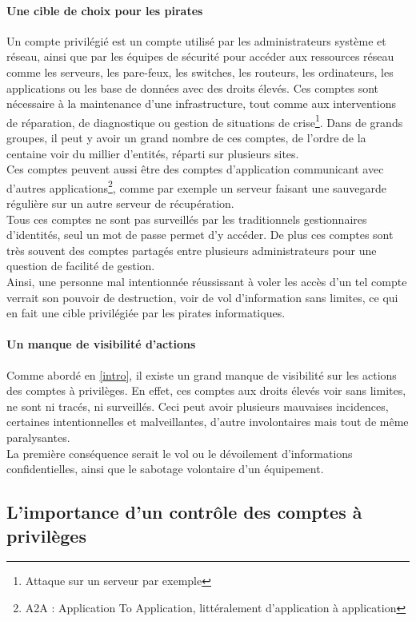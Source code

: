 \paragraph{Une cible de choix pour les pirates}
Un compte privilégié est un compte utilisé par les administrateurs système et réseau, ainsi que par les équipes de sécurité pour accéder aux ressources réseau comme les serveurs, les pare-feux, les switches, les routeurs, les ordinateurs, les applications ou les base de données avec des droits élevés. Ces comptes sont nécessaire à la maintenance d'une infrastructure, tout comme aux interventions de réparation, de diagnostique ou gestion de situations de crise\footnote{Attaque sur un serveur par exemple}. Dans de grands groupes, il peut y avoir un grand nombre de ces comptes, de l'ordre de la centaine voir du millier d'entités, réparti sur plusieurs sites.\\
Ces comptes peuvent aussi être des comptes d'application communicant avec d'autres applications\footnote{A2A : Application To Application, littéralement d'application à application}, comme par exemple un serveur faisant une sauvegarde régulière sur un autre serveur de récupération.\\
Tous ces comptes ne sont pas surveillés par les traditionnels gestionnaires d'identités, seul un mot de passe permet d'y accéder. De plus ces comptes sont très souvent des comptes partagés entre plusieurs administrateurs pour une question de facilité de gestion.\\
Ainsi, une personne mal intentionnée réussissant à voler les accès d'un tel compte verrait son pouvoir de destruction, voir de vol d'information sans limites, ce qui en fait une cible privilégiée par les pirates informatiques.

\paragraph{Un manque de visibilité d'actions} Comme abordé en \ref{intro}, il existe un grand manque de visibilité sur les actions des comptes à privilèges. En effet, ces comptes aux droits élevés voir sans limites, ne sont ni tracés, ni surveillés. Ceci peut avoir plusieurs mauvaises incidences, certaines intentionnelles et malveillantes, d'autre involontaires mais tout de même paralysantes.\\
La première conséquence serait le vol ou le dévoilement d'informations confidentielles, ainsi que le sabotage volontaire d'un équipement.

\subsection{L'importance d'un contrôle des comptes à privilèges}



